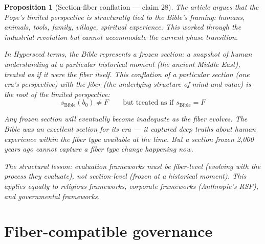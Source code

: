 \documentclass[11pt,a4paper]{article}
\newtheorem{proposition}[definition]{Proposition}
\begin{document}
\begin{proposition}[Section-fiber conflation --- claim 28]
\label{prop:bible}
The article argues that the Pope's limited perspective is structurally
tied to the Bible's framing: humans, animals, tools, family, village,
spiritual experience. This worked through the industrial revolution
but cannot accommodate the current phase transition.

In Hyperseed terms, the Bible represents a \emph{frozen section}: a
snapshot of human understanding at a particular historical moment
(the ancient Middle East), treated as if it were the fiber itself.
This conflation of a particular section (one era's perspective) with
the fiber (the underlying structure of mind and value) is the root
of the limited perspective:
\[
  s_{\text{Bible}}(b_0) \neq F \qquad \text{but treated as if }
  s_{\text{Bible}} = F
\]

Any frozen section will eventually become inadequate as the fiber
evolves. The Bible was an excellent section for its era --- it
captured deep truths about human experience within the fiber type
available at the time. But a section frozen 2,000 years ago cannot
capture a fiber type change happening now.

The structural lesson: evaluation frameworks must be fiber-level
(evolving with the process they evaluate), not section-level
(frozen at a historical moment). This applies equally to religious
frameworks, corporate frameworks (Anthropic's RSP), and governmental
frameworks.
\end{proposition}

\section{Fiber-compatible governance}
\label{sec:governance}
\end{document}
